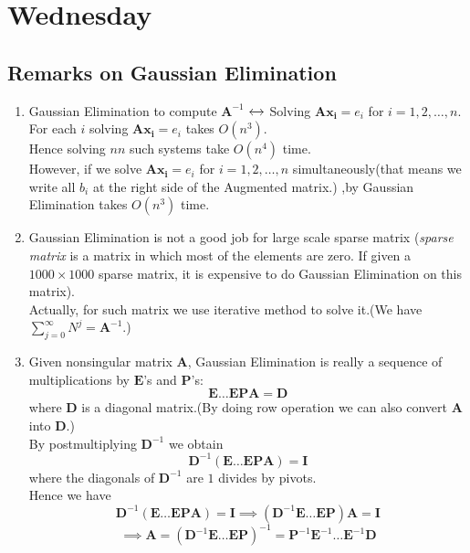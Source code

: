 

\section{Wednesday}
\subsection{Remarks on Gaussian Elimination}
\begin{enumerate}
\item
Gaussian Elimination to compute $\bm A^{-1}$ 
$\xleftrightarrow{}$
Solving $\bm{Ax_{i}} =e_i$ for $i=1,2,\dots,n$.\\
For each $i$ solving $\bm{Ax_i} = e_i$ takes $O(n^3)$.\\ Hence solving $nn$ such systems take $O(n^4)$ time.\\
However, if we solve $\bm{Ax_i} = e_i$ for $i=1,2,\dots,n$ simultaneously(that means we write all $b_i$ at the right side of the Augmented matrix.) ,by Gaussian Elimination takes $O(n^3)$ time.
\item
Gaussian Elimination is not a good job for large scale sparse matrix (\emph{sparse matrix} is a matrix in which most of the elements are zero. If given a $1000\times 1000$ sparse matrix, it is expensive to do Gaussian Elimination on this matrix).\\
Actually, for such matrix we use iterative method to solve it.(We have $\sum_{j=0}^{\infty}N^{j} = \bm A^{-1}$.)
\item
Given nonsingular matrix $\bm A$, Gaussian Elimination is really a sequence of multiplications by $\bm E$'s and $\bm P$'s:
\[
\bm E\ldots\bm E\bm P \bm A= \bm D
\]
where $\bm D$ is a diagonal matrix.(By doing row operation we can also convert $\bm A$ into $\bm D$.)\\
By postmultiplying $\bm D^{-1}$ we obtain 
\[
\bm D^{-1}(\bm E\ldots\bm E\bm P \bm A) = \bm I
\]
where the diagonals of $\bm D^{-1}$ are $1$ divides by pivots.\\
Hence we have
\[
\bm D^{-1}(\bm E\ldots\bm E\bm P \bm A) = \bm I
\implies (\bm D^{-1}\bm E\ldots\bm E\bm P )\bm A = \bm I
\]\[
\implies
\bm A = (\bm D^{-1}\bm E\ldots\bm E\bm P )^{-1} = \bm P^{-1}\bm E^{-1}\ldots\bm E^{-1}\bm D
\]

\end{enumerate}
